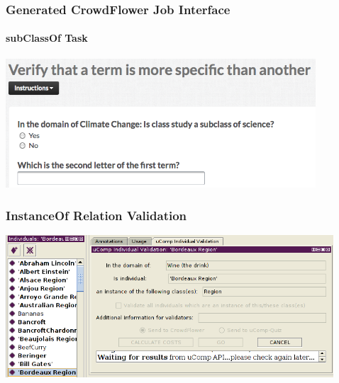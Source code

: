 \documentclass{beamer}
\begin{document}
\begin{frame}
  \frametitle{Generated CrowdFlower Job Interface}
  \framesubtitle{subClassOf Task}
   \center
  \includegraphics[height=1.9in]{images/CFsubclasscheck}
\end{frame}


\begin{frame}
  \frametitle{InstanceOf Relation Validation}
   \center
  \includegraphics[height=2.1in]{images/screenshot_indiv}
\end{frame}


\end{document}
